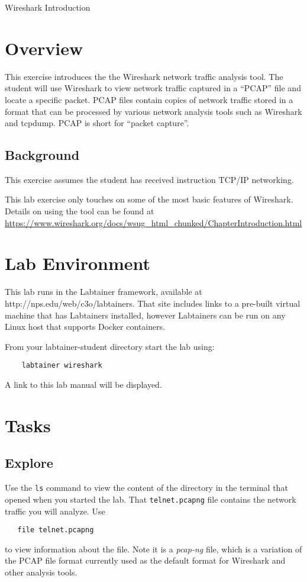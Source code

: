 


\begin{center}
{\LARGE Wireshark Introduction}
\vspace{0.1in}\\
\end{center}


\section{Overview}
This exercise introduces the the Wireshark network traffic analysis tool.
The student will use Wireshark to view network traffic captured in a ``PCAP''
file and locate a specific packet.  PCAP files contain
copies of network traffic stored in a format that can be processed
by various network analysis tools such as Wireshark and
tcpdump.  PCAP is short for ``packet capture''.

\subsection{Background}
This exercise assumes the student has received instruction TCP/IP networking.

This lab exercise only touches on some of the most basic features of Wireshark.
Details on using the tool can be found at \url{https://www.wireshark.org/docs/wsug\_html\_chunked/ChapterIntroduction.html}

\section{Lab Environment}
This lab runs in the Labtainer framework,
available at http://nps.edu/web/c3o/labtainers.
That site includes links to a pre-built virtual machine
that has Labtainers installed, however Labtainers can
be run on any Linux host that supports Docker containers.

From your labtainer-student directory start the lab using:
\begin{verbatim}
    labtainer wireshark
\end{verbatim}
A link to this lab manual will be displayed.

\section{Tasks}
\subsection{Explore}
Use the {\tt ls} command to view the content of the directory in the terminal that opened when you started the lab.
That {\tt telnet.pcapng} file contains the network traffic you will analyze.  Use
\begin{verbatim}
   file telnet.pcapng
\end{verbatim}
\noindent to view information about the file.  Note it is a \textit{pcap-ng} file, which is a variation of the PCAP file format
currently used as the default format for Wireshark and other analysis tools.

